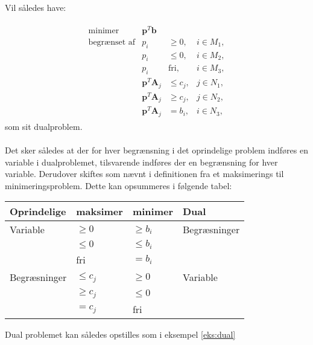 Vil således have:


\begin{align*}
\begin{array}{lrll}
\text{minimer}		&\textbf{p}^T\textbf{b}	&			&\\
\text{begrænset af}	&p_i					&\geq 0,	&i \in M_1,\\
					&p_i					&\leq 0,	&i \in M_2,\\
					&p_i					&\text{fri},	&i \in M_3,\\
					&\textbf{p}^T\textbf{A}_j	&\leq c_j,	&j \in N_1,\\
					&\textbf{p}^T\textbf{A}_j	&\geq c_j,	&j \in N_2,\\
					&\textbf{p}^T\textbf{A}_j	& = b_i,	&i \in N_3,
\end{array}
\end{align*}
%
som sit dualproblem.
\\\\
%
Det sker således at der for hver begrænsning i det oprindelige problem indføres en variable i dualproblemet, tilsvarende indføres der en begrænsning for hver variable. 
Derudover skiftes som nævnt i definitionen fra et maksimerings til minimeringsproblem. 
Dette kan opsummeres i følgende tabel: \\
\begin{table}[H]
\begin{center}
\begin{tabular}{llll}
Oprindelige  & maksimer   & minimer    & Dual         \\
\hline
Variable     & $\geq 0$   & $\geq b_i$ & Begræsninger \\
             & $\leq 0$   & $\leq b_i$ &              \\
             & fri        & $=b_i$     &              \\
\hline
Begræsninger & $\leq c_j$ & $\geq 0$   & Variable     \\
             & $\geq c_j$ & $\leq 0$   &              \\
             & $=c_j$     & fri        &             
\end{tabular}
\end{center}
\end{table}
\noindent
Dual problemet kan således opstilles som i eksempel \ref{eks:dual} \\
%
